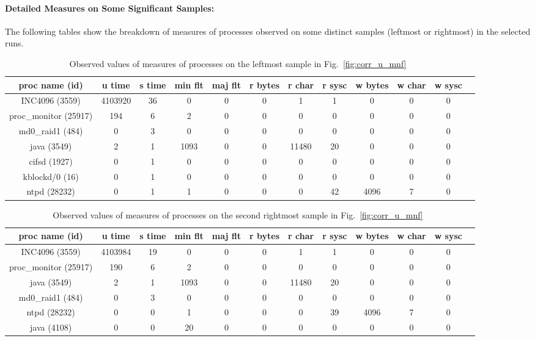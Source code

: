 \clearpage
\pagebreak

\paragraph{Detailed Measures on Some Significant Samples:} 
The following tables show the breakdown of 
measures of processes observed on some distinct samples (leftmost or rightmost) 
in the selected runs.

\begin{table}[htp!]
\begin{center}
\begin{tabular}{|c|c|c|c|c|c|c|c|c|c|c|c|} \hline
proc name (id) & u time & s time & min flt & maj flt & r bytes & r char & r sysc & w bytes & w char & w sysc\\ \hline
INC4096 (3559) & 4103920 & 36 & 0 & 0 & 0 & 1 & 1 & 0 & 0 & 0 \\ \hline
proc\_monitor (25917) & 194 & 6 & 2 & 0 & 0 & 0 & 0 & 0 & 0 & 0 \\ \hline
md0\_raid1 (484) & 0 &  3 & 0 & 0 & 0 & 0 & 0 & 0 & 0 & 0 \\ \hline
java (3549) & 2 & 1 & 1093 & 0 & 0 & 11480 & 20 & 0 & 0 & 0 \\ \hline
cifsd (1927) & 0 & 1 & 0 & 0 & 0 & 0 & 0 & 0 & 0 & 0 \\ \hline
kblockd/0 (16) & 0 & 1 & 0 & 0 & 0 & 0 & 0 & 0 & 0 & 0 \\ \hline
ntpd (28232) & 0 & 1 & 1 & 0 & 0 & 0 & 42 & 4096 & 7 & 0 \\ \hline
\end{tabular}
\end{center}
\caption{Observed values of measures of processes on the leftmost sample in Fig.~\ref{fig:corr_u_mnf}~\label{tab:breakdown}}
\end{table}

\begin{table}[htp!]
\begin{center}
\begin{tabular}{|c|c|c|c|c|c|c|c|c|c|c|c|} \hline
proc name (id) & u time & s time & min flt & maj flt & r bytes & r char & r sysc & w bytes & w char & w sysc\\ \hline
INC4096 (3559) & 4103984 & 19 & 0 & 0 & 0 & 1 & 1 & 0 & 0 & 0 \\ \hline
proc\_monitor (25917) & 190 & 6 & 2 & 0 & 0 & 0 & 0 & 0 & 0 & 0 \\ \hline
java (3549) & 2 & 1 & 1093 & 0 & 0 & 11480 & 20 & 0 & 0 & 0 \\ \hline
md0\_raid1 (484) & 0 & 3 & 0 & 0 & 0 & 0 & 0 & 0 & 0 & 0 \\ \hline
ntpd (28232) & 0 & 0 & 1 & 0 & 0 & 0 & 39 & 4096 & 7 & 0 \\ \hline
java (4108) & 0 & 0  & 20 & 0 & 0 & 0 & 0 & 0 & 0 & 0 \\ \hline
\end{tabular}
\end{center}
\caption{Observed values of measures of processes on the second rightmost sample in Fig.~\ref{fig:corr_u_mnf}~\label{tab:breakdown2}}
\end{table}

